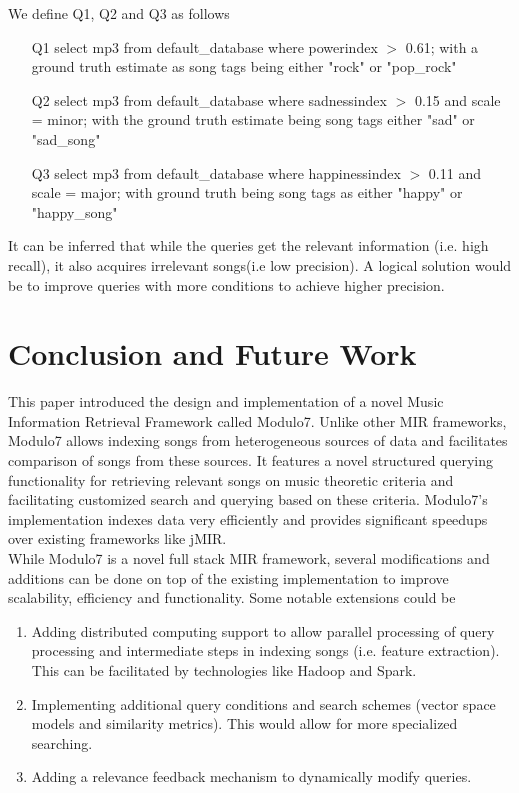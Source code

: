 \documentclass{article}
\begin{document}
\noindent We define Q1, Q2 and Q3 as follows

\begin{enumerate}
\item [Q1] select mp3 from default\_database where powerindex $>$ 0.61; with a ground truth estimate as song tags being either "rock" or "pop\_rock"
\item [Q2] select mp3 from default\_database where sadnessindex $>$ 0.15 and scale = minor; with the ground truth estimate being song tags either "sad" or "sad\_song" 
\item [Q3] select mp3 from default\_database where happinessindex $>$ 0.11 and scale = major; with ground truth being song tags as either "happy" or "happy\_song"
\end{enumerate}

\noindent It can be inferred that while the queries get the relevant information (i.e. high recall), it also acquires irrelevant songs(i.e low precision). A logical solution would be to improve queries with more conditions to achieve higher precision.   


\section{Conclusion and Future Work}

\noindent This paper introduced the design and implementation of a novel Music Information Retrieval Framework called Modulo7. Unlike other MIR frameworks, Modulo7 allows indexing songs from heterogeneous sources of data and facilitates comparison of songs from these sources. It features a novel structured querying functionality for retrieving relevant songs on music theoretic criteria and facilitating customized search and querying based on these criteria. Modulo7's implementation indexes data very efficiently and provides significant speedups over existing frameworks like jMIR. \\

\noindent While Modulo7 is a novel full stack MIR framework, several modifications and additions can be done on top of the existing implementation to improve scalability, efficiency and functionality. Some notable extensions could be 

\begin{enumerate}
\item Adding distributed computing support to allow parallel processing of query processing and intermediate steps in indexing songs (i.e. feature extraction). This can be facilitated by technologies like Hadoop and Spark.
\item Implementing additional query conditions and search schemes (vector space models and similarity metrics). This would allow for more specialized searching. 
\item Adding a relevance feedback mechanism to dynamically modify queries. 
\end{enumerate}


\end{document}
